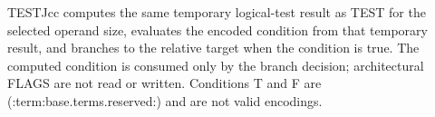 TESTJcc computes the same temporary logical-test result as TEST for the selected operand size, evaluates the encoded condition from that temporary result, and branches to the relative target when the condition is true. The computed condition is consumed only by the branch decision; architectural FLAGS are not read or written. Conditions T and F are (:term:base.terms.reserved:) and are not valid encodings.
